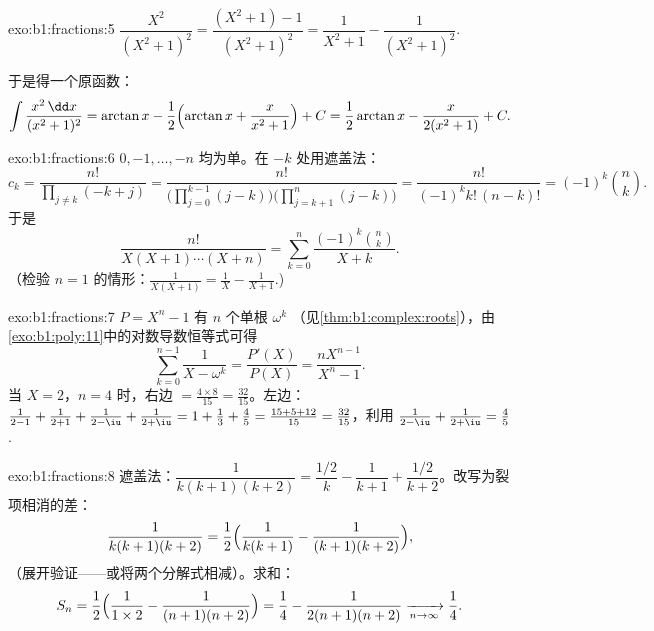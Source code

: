 \begin{solution}{exo:b1:fractions:5}
$\dfrac{X^2}{(X^2+1)^2} = \dfrac{(X^2 + 1) - 1}{(X^2+1)^2} =
\dfrac{1}{X^2+1} - \dfrac{1}{(X^2+1)^2}$.

于是得一个原函数：
\[
\int \frac{x^2\,\dd x}{(x^2+1)^2}
= \arctan x - \frac12\Bigl(\arctan x + \frac{x}{x^2+1}\Bigr) + C
= \frac12\arctan x - \frac{x}{2(x^2+1)} + C .
\]
\end{solution}

\begin{solution}{exo:b1:fractions:6}
 $0, -1, \dots, -n$ 均为单。在 $-k$ 处用遮盖法：
\[
c_k = \frac{n!}{\prod_{j \neq k} (-k + j)}
= \frac{n!}{\bigl(\prod_{j=0}^{k-1}(j - k)\bigr)
\bigl(\prod_{j=k+1}^{n}(j-k)\bigr)}
= \frac{n!}{(-1)^k k!\,(n-k)!} = (-1)^k \binom nk .
\]
于是
\[
\frac{n!}{X(X+1)\cdots(X+n)}
= \sum_{k=0}^{n} \frac{(-1)^k \binom nk}{X + k} .
\]
（检验 $n = 1$ 的情形：$\frac{1}{X(X+1)} = \frac1X -
\frac{1}{X+1}$.)
\end{solution}

\begin{solution}{exo:b1:fractions:7}
$P = X^n - 1$ 有 $n$ 个单根 $\omega^k$
（见\cref{thm:b1:complex:roots}），由
\cref{exo:b1:poly:11}中的对数导数恒等式可得
\[
\sum_{k=0}^{n-1} \frac{1}{X - \omega^k}
= \frac{P'(X)}{P(X)} = \frac{n X^{n-1}}{X^n - 1} .
\]
当 $X = 2$，$n = 4$ 时，右边 $= \frac{4 \times 8}{15} =
\frac{32}{15}$。左边：$\frac{1}{2-1} + \frac{1}{2+1} +
\frac{1}{2 - \iu} + \frac{1}{2 + \iu} = 1 + \frac13 + \frac{4}{5} =
\frac{15 + 5 + 12}{15} = \frac{32}{15}$，利用 $\frac{1}{2-\iu} +
\frac{1}{2+\iu} = \frac{4}{5}$.
\end{solution}

\begin{solution}{exo:b1:fractions:8}
遮盖法：$\dfrac{1}{k(k+1)(k+2)} = \dfrac{1/2}{k} - \dfrac{1}{k+1} +
\dfrac{1/2}{k+2}$。改写为裂项相消的差：
\[
\frac{1}{k(k+1)(k+2)}
= \frac12\Bigl(\frac{1}{k(k+1)} - \frac{1}{(k+1)(k+2)}\Bigr),
\]
（展开验证——或将两个分解式相减）。求和：
\[
S_n = \frac12\Bigl(\frac{1}{1 \times 2} - \frac{1}{(n+1)(n+2)}\Bigr)
= \frac14 - \frac{1}{2(n+1)(n+2)}
\xrightarrow[n \to \infty]{} \frac14 .
\]
\end{solution}

